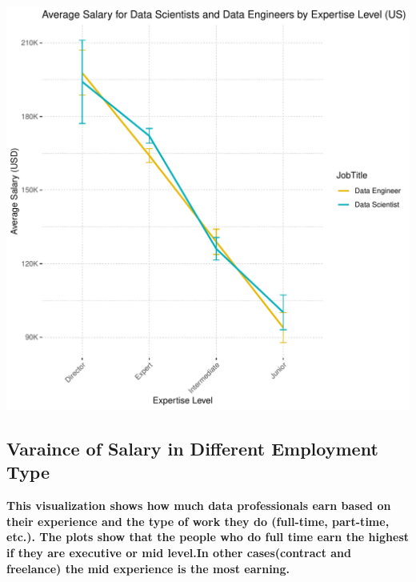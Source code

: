 \documentclass{article}\usepackage[]{graphicx}\usepackage[]{xcolor}
\makeatletter
\def\maxwidth{ %
  \ifdim\Gin@nat@width>\linewidth
    \linewidth
  \else
    \Gin@nat@width
  \fi
}
\newenvironment{knitrout}{}{} %
\makeatother
\begin{document}
\begin{knitrout}
\includegraphics[width=\maxwidth]{figure/unnamed-chunk-2-3} 
\end{knitrout}

\newpage
\subsection{Varaince of Salary in Different Employment Type}

\textbf{This visualization shows how much data professionals earn based on their experience and the type of work they do (full-time, part-time, etc.). The plots show that the people who do full time earn the highest if they are executive or mid level.In other cases(contract and freelance) the mid experience is the most earning. }
\end{document}
